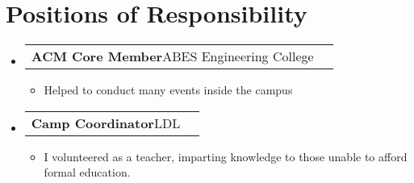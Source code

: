 \documentclass[a4paper,11pt]{article}
\makeatletter
\newcommand{\resumePOR}[3]{
\vspace{0.5mm}\item
    \begin{tabular*}{0.97\textwidth}[t]{l@{\extracolsep{\fill}}r}
        \textbf{#1}\hspace{0.3mm}#2 & \textit{\small{#3}} 
    \end{tabular*}
    \vspace{-2mm}
}
\newcommand{\resumeSubHeadingListStart}{\begin{itemize}[leftmargin=*,labelsep=0mm]}
\newcommand{\resumeItemListStart}{\begin{justify}\begin{itemize}[leftmargin=3ex, rightmargin=2ex, noitemsep,labelsep=1.2mm,itemsep=0mm]\small}
\newcommand{\resumeSubHeadingListEnd}{\end{itemize}\vspace{2mm}}
\newcommand{\resumeItemListEnd}{\end{itemize}\end{justify}\vspace{-2mm}}
\makeatother
\begin{document}
\section{\textbf{Positions of Responsibility}}
\vspace{-0.4mm}
\resumeSubHeadingListStart
\resumePOR{ ACM  Core Member} %
    {ABES Engineering College} %
    {} %
    \resumeItemListStart
    \item {Helped to conduct many events inside the campus}
    \resumeItemListEnd
    \resumePOR{ Camp Coordinator} %
    {LDL} %
    {} %
    \resumeItemListStart
    \item {I volunteered as a teacher, imparting knowledge to those unable to afford formal education.}
    \resumeItemListEnd

\resumeSubHeadingListEnd
\vspace{-5mm}





    



\end{document}
